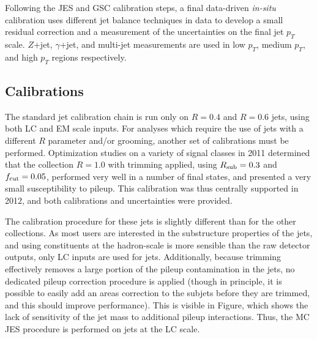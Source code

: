 Following the JES and GSC calibration steps, a final data-driven \textit{in-situ} calibration uses different jet balance techniques in data to develop a small residual correction and a measurement of the uncertainties on the final jet $p_T$ scale. $Z$+jet, $\gamma$+jet, and multi-jet measurements are used in low $p_T$, medium $p_T$, and high $p_T$ regions respectively.

\subsection{\LargeR Calibrations}

The standard jet calibration chain is run only on $R=0.4$ and $R=0.6$ jets, using both LC and EM scale inputs. For analyses which require the use of jets with a different $R$ parameter and/or grooming, another set of calibrations must be performed. Optimization studies on a variety of signal classes in 2011 determined that the collection \antikt $R=1.0$ with trimming applied, using $R_{\rm sub} = 0.3$ and $f_{\rm cut} = 0.05$, performed very well in a number of final states, and presented a very small susceptibility to pileup. This calibration was thus centrally supported in 2012, and both calibrations and uncertainties were provided.

The calibration procedure for these \largeR jets is slightly different than for the other collections. As most users are interested in the substructure properties of the jets, and using constituents at the hadron-scale is more sensible than the raw detector outputs, only LC inputs are used for \largeR jets. Additionally, because trimming effectively removes a large portion of the pileup contamination in the jets, no dedicated pileup correction procedure is applied (though in principle, it is possible to easily add an areas correction to the subjets before they are trimmed, and this should improve performance). This is visible in Figure, which shows the lack of sensitivity of the jet mass to additional pileup interactions. Thus, the MC JES procedure is performed on jets at the LC scale.

